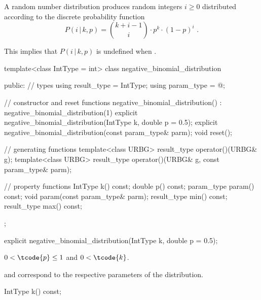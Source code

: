 \pnum
A  random number distribution
produces random integers $i \geq 0$
distributed according to
the discrete probability function
%
%
\[ P(i\,|\,k,p) = \binom{k+i-1}{i} \cdot p^k \cdot (1-p)^i \text{ .} \]
\begin{note}
This implies that $P(i\,|\,k,p)$ is undefined when .
\end{note}

%
%
\begin{codeblock}
template<class IntType = int>
  class negative_binomial_distribution {
  public:
    // types
    using result_type = IntType;
    using param_type  = @\unspec@;

    // constructor and reset functions
    negative_binomial_distribution() : negative_binomial_distribution(1) {}
    explicit negative_binomial_distribution(IntType k, double p = 0.5);
    explicit negative_binomial_distribution(const param_type& parm);
    void reset();

    // generating functions
    template<class URBG>
      result_type operator()(URBG& g);
    template<class URBG>
      result_type operator()(URBG& g, const param_type& parm);

    // property functions
    IntType k() const;
    double p() const;
    param_type param() const;
    void param(const param_type& parm);
    result_type min() const;
    result_type max() const;
  };
\end{codeblock}


\begin{indexed}{}
\begin{itemdecl}
explicit negative_binomial_distribution(IntType k, double p = 0.5);
\end{itemdecl}
\end{indexed}

\begin{itemdescr}
\pnum
\expects
$0 < \tcode{p} \leq 1$
and $0 < \tcode{k} $.

\pnum
\remarks
  and 
 correspond to the respective parameters of the distribution.
\end{itemdescr}

%
\begin{itemdecl}
IntType k() const;
\end{itemdecl}

